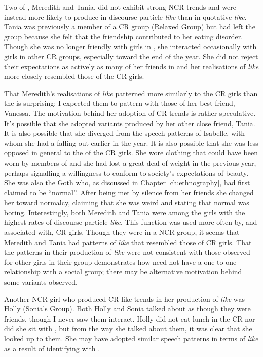 Two of , Meredith and Tania, did not exhibit strong NCR trends and were instead more likely to produce  in discourse particle \textit{like} than in quotative \textit{like}. Tania was previously a member of a CR group (Relaxed Group) but had left the group because she felt that the friendship contributed to her eating disorder. Though she was no longer friendly with girls in , she interacted occasionally with girls in other CR groups, especially toward the end of the year. She did not reject their expectations as actively as many of her friends in  and her realisations of \textit{like} more closely resembled those of the CR girls. 

That Meredith's realisations of \textit{like} patterned more similarly to the CR girls than the  is surprising; I expected them to pattern with those of her best friend, Vanessa. The motivation behind her adoption of CR trends is rather speculative. It's possible that she adopted variants produced by her other close friend, Tania. It is also possible that she diverged from the speech patterns of Isabelle, with whom she had a falling out earlier in the year. It is also possible that she was less opposed in general to the  of the CR girls. She wore clothing that could have been worn by members of  and she had lost a great deal of weight in the previous year, perhaps signalling a willingness to conform to society's expectations of beauty. She was also the Goth who, as discussed in Chapter \ref{ch:ethnography}, had first claimed to be ``normal''. After being met by silence from her friends she changed her  toward normalcy, claiming that she was weird and stating that normal was boring. Interestingly, both Meredith and Tania were among the girls with the highest rates of discourse particle \textit{like}. This function was used more often by, and associated with, CR girls. Though they were in a NCR group, it seems that Meredith and Tania had patterns of \textit{like} that resembled those of CR girls. That the patterns in their production of \textit{like} were not consistent with those observed for other girls in their group demonstrates how  need not have a one-to-one relationship with a social group; there may be alternative motivation behind some variants observed. 

Another NCR girl who produced CR-like trends in her production of \textit{like} was Holly (Sonia's Group). Both Holly and Sonia talked about  as though they were friends, though I never saw them interact. Holly did not eat lunch in the CR nor did she sit with , but from the way she talked about them, it was clear that she looked up to them. She may have adopted similar speech patterns in terms of \textit{like} as a result of identifying with .




